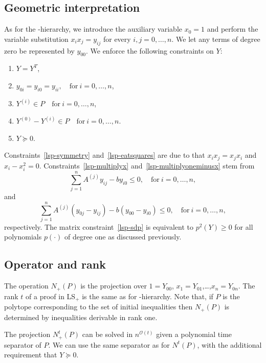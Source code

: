 \documentclass[a4paper,twoside,justified]{tufte-handout}
\begin{document}
\subsection{Geometric interpretation}
As for the \Lovasz-\Schrijver hierarchy, we introduce the auxiliary variable $x_0=1$ and perform the variable substitution $x_ix_j=y_{ij}$ for every $i,j=0,\ldots,n$. We let any terms of degree zero be represented by $y_{00}$. We enforce the following constraints on $Y$:
\begin{enumerate}
\item \label{lsp-symmetry} $Y=Y^T$,
\item \label{lsp-eatsquares} $y_{0i}=y_{i0}=y_{ii}, \quad\text{for}\ i=0,\ldots,n$,
\item \label{lsp-multiplyx} $Y^{(i)}\in P \quad\text{for}\ i=0,\ldots,n$,
\item \label{lsp-multiplyoneminusx} $Y^{(0)}-Y^{(i)}\in P \quad\text{for}\ i=0,\ldots,n$.
\item \label{lsp-sdp} $Y\succeq0$.
\end{enumerate}
Constraints~\ref{lsp-symmetry} and~\ref{lsp-eatsquares} are due to that $x_ix_j=x_jx_i$ and $x_i-x_i^2=0$. Constraints~\ref{lsp-multiplyx} and~\ref{lsp-multiplyoneminusx} stem from 
\[\sum_{j=1}^{n} A^{(j)}y_{ij}-by_{i0}\leq 0, \quad\text{for}\ i=0,\ldots,n,\]
and 
\[\sum_{j=1}^{n} A^{(j)}(y_{0j}-y_{ij})-b(y_{00}-y_{i0})\leq 0, \quad\text{for}\ i=0,\ldots,n,\]
respectively. The matrix constraint~\ref{lsp-sdp} is equivalent to $p^2(Y)\geq0$ for all polynomials $p(\cdot)$ of degree one as discussed previously.

\subsection{Operator and rank}
The operation $N_+(P)$ is the projection over $1=Y_{00}$, $x_1=Y_{01}$,\ldots,$x_n=Y_{0n}$. The rank $t$ of a proof in LS$_+$ is the same as for \Lovasz-\Schrijver hierarchy. Note that, if $P$ is the polytope corresponding to the set of initial inequalities then $N_+(P)$ is determined by inequalities derivable in rank one. 

The projection $N_+^t(P)$ can be solved in $n^{\mathcal{O}(t)}$ given a polynomial time separator of $P$. We can use the same separator as for $N^t(P)$, with the additional requirement that $Y\succeq0$.
\end{document}
